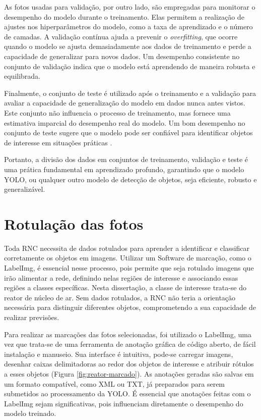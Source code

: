 As fotos usadas para validação, por outro lado, são empregadas para monitorar o desempenho do modelo durante o treinamento. Elas permitem a realização de ajustes nos hiperparâmetros do modelo, como a taxa de aprendizado e o número de camadas. A validação contínua ajuda a prevenir o \textit{overfitting}, que ocorre quando o modelo se ajusta demasiadamente aos dados de treinamento e perde a capacidade de generalizar para novos dados. Um desempenho consistente no conjunto de validação indica que o modelo está aprendendo de maneira robusta e equilibrada.

Finalmente, o conjunto de teste é utilizado após o treinamento e a validação para avaliar a capacidade de generalização do modelo em dados nunca antes vistos. Este conjunto não influencia o processo de treinamento, mas fornece uma estimativa imparcial do desempenho real do modelo. Um bom desempenho no conjunto de teste sugere que o modelo pode ser confiável para identificar objetos de interesse em situações práticas \cite{goodfellow2016deep}.

Portanto, a divisão dos dados em conjuntos de treinamento, validação e teste é uma prática fundamental em aprendizado profundo, garantindo que o modelo YOLO, ou qualquer outro modelo de detecção de objetos, seja eficiente, robusto e generalizável.

\section{Rotulação das fotos}

Toda RNC necessita de dados rotulados para aprender a identificar e classificar corretamente os objetos em imagens. Utilizar um Software de marcação, como o LabelImg, é essencial nesse processo, pois permite que seja rotulado imagens que irão alimentar a rede, definindo nelas regiões de interesse e associando essas regiões a classes específicas. Nesta dissertação, a classe de interesse trata-se do reator de núcleo de ar. Sem dados rotulados, a RNC não teria a orientação necessária para distinguir diferentes objetos, comprometendo a sua capacidade de realizar previsões.

Para realizar as marcações das fotos selecionadas, foi utilizado o LabelImg, uma vez que trata-se de uma ferramenta de anotação gráfica de código aberto, de fácil instalação e manuseio. Sua interface é intuitiva, pode-se carregar imagens, desenhar caixas delimitadoras ao redor dos objetos de interesse e atribuir rótulos a esses objetos (Figura \ref{fig:reator-marcado}). As anotações geradas são salvas em um formato compatível, como XML ou TXT, já preparados para serem submetidos ao processamento da YOLO. É essencial que anotações feitas com o LabelImg sejam significativas, pois influenciam diretamente o desempenho do modelo treinado.

